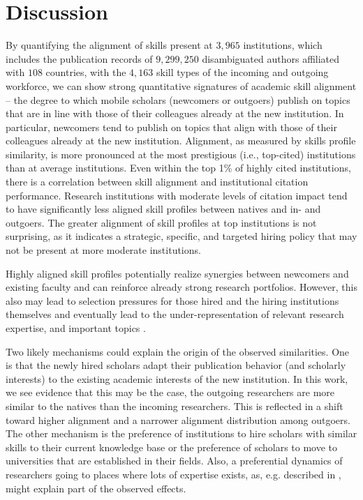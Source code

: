 \documentclass[draft,final]{vutinfth} %
\begin{document}
\section{Discussion}
By quantifying the alignment of skills present at $3,965$ institutions, which includes the publication records of $9,299,250$ disambiguated authors affiliated with $108$ countries, with the $4,163$ skill types of the incoming and outgoing workforce, we can show strong quantitative signatures of academic skill alignment -- the degree to which mobile scholars (newcomers or outgoers) publish on topics that are in line with those of their colleagues already at the new institution. In particular, newcomers tend to publish on topics that align with those of their colleagues already at the new institution. Alignment, as measured by skills profile similarity, is more pronounced at the most prestigious (i.e., top-cited) institutions than at average institutions. Even within the top 1\% of highly cited institutions, there is a correlation between skill alignment and institutional citation performance. Research institutions with moderate levels of citation impact tend to have significantly less aligned skill profiles between natives and in- and outgoers. The greater alignment of skill profiles at top institutions is not surprising, as it indicates a strategic, specific, and targeted hiring policy that may not be present at more moderate institutions.

Highly aligned skill profiles potentially realize synergies between newcomers and existing faculty \cite{arthur1984competing, cohen1990absorptive} and can reinforce already strong research portfolios. However, this also may lead to selection pressures for those hired and the hiring institutions themselves and eventually lead to the under-representation of relevant research expertise, and important topics \cite{evans2014attention}. 

Two likely mechanisms could explain the origin of the observed similarities. One is that the newly hired scholars adapt their publication behavior (and scholarly interests) to the existing academic interests of the new institution. In this work, we see evidence that this may be the case, the outgoing researchers are more similar to the natives than the incoming researchers. This is reflected in a shift toward higher alignment and a narrower alignment distribution among outgoers. The other mechanism is the preference of institutions to hire scholars with similar skills to their current knowledge base or the preference of scholars to move to universities that are established in their fields. Also, a preferential dynamics of researchers going to places where lots of expertise exists, as, e.g. described in \cite{vitomarcia22}, might explain part of the observed effects. 
\end{document}
